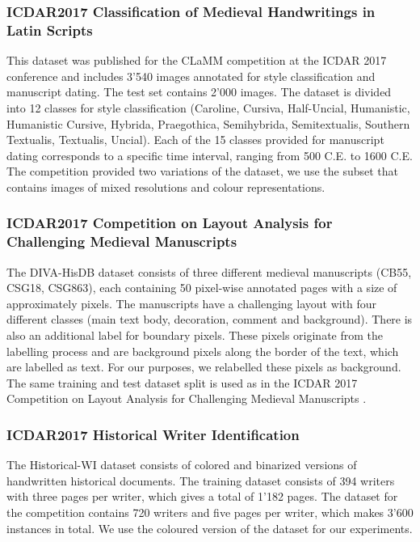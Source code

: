 \documentclass[journal]{IEEEtran}
\begin{document}
\subsubsection{ICDAR2017 Classification of Medieval Handwritings in Latin Scripts}
This dataset was published for the \acf{CLaMM} competition \cite{cloppet2017icdar2017} at the \ac{ICDAR} 2017 conference and includes 3'540 images annotated for style classification and manuscript dating. 
The test set contains 2'000 images. 
The dataset is divided into 12 classes for style classification 
(Caroline, Cursiva, Half-Uncial, Humanistic, Humanistic Cursive, Hybrida, Praegothica, Semihybrida, Semitextualis, Southern Textualis, Textualis, Uncial). 
Each of the 15 classes provided for manuscript dating corresponds to a specific time interval, ranging from 500 C.E. to 1600 C.E.
The competition provided two variations of the dataset, we use the subset that contains images of mixed resolutions and colour representations.

\subsubsection{ICDAR2017 Competition on Layout Analysis for Challenging Medieval Manuscripts}
The DIVA-HisDB dataset \cite{simistira2016diva} consists of three different medieval manuscripts (CB55, CSG18, CSG863), each containing 50 pixel-wise annotated pages with a size of approximately  pixels. 
The manuscripts have a challenging layout with four different classes (main text body, decoration, comment and background). 
There is also an additional label for boundary pixels. 
These pixels originate from the labelling process and are background pixels along the border of the text, which are labelled as text. For our purposes, we relabelled these pixels as background. The same training and test dataset split is used as in the \ac{ICDAR} 2017 Competition on Layout Analysis for Challenging Medieval Manuscripts \cite{simistira2017icdar2017}.


\subsubsection{ICDAR2017 Historical Writer Identification}
The \ac{Historical-WI} dataset \cite{fiel2017icdar2017} consists of colored and binarized versions of handwritten historical documents. 
The training dataset consists of 394 writers with three pages per writer, which gives a total of 1'182 pages. 
The dataset for the competition contains 720 writers and five pages per writer, which makes 3'600 instances in total. 
We use the coloured version of the dataset for our experiments.
\end{document}
